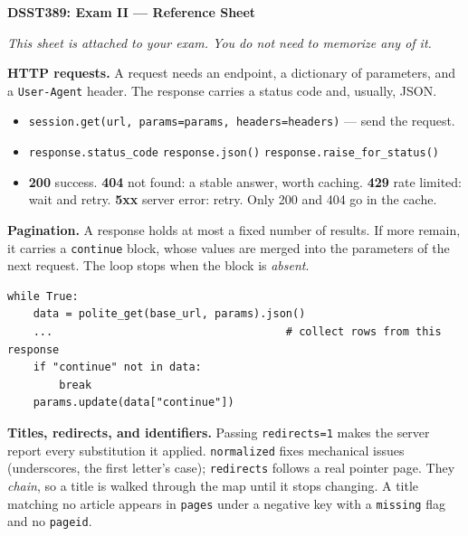 \documentclass[11pt, a4paper]{article}
\newcommand{\code}[1]{\texttt{#1}}
\begin{document}
\footnotesize
\sloppy

\begin{center}
\normalsize\textbf{DSST389: Exam II --- Reference Sheet}
\end{center}

\smallskip

\textit{This sheet is attached to your exam. You do not need to memorize any of it.}

\smallskip

\textbf{HTTP requests.}
A request needs an endpoint, a dictionary of parameters, and a \code{User-Agent} header.
The response carries a status code and, usually, JSON.

\begin{itemize}
  \item \code{session.get(url, params=params, headers=headers)} --- send the request.
  \item \code{response.status\_code} \quad \code{response.json()} \quad
        \code{response.raise\_for\_status()}
  \item \textbf{200} success. \quad \textbf{404} not found: a stable answer, worth caching.
        \quad \textbf{429} rate limited: wait and retry. \quad \textbf{5xx} server error:
        retry. Only 200 and 404 go in the cache.
\end{itemize}

\smallskip

\textbf{Pagination.}
A response holds at most a fixed number of results. If more remain, it carries a
\code{continue} block, whose values are merged into the parameters of the next request.
The loop stops when the block is \textit{absent}.

\begin{verbatim}
while True:
    data = polite_get(base_url, params).json()
    ...                                    # collect rows from this response
    if "continue" not in data:
        break
    params.update(data["continue"])
\end{verbatim}

\smallskip

\textbf{Titles, redirects, and identifiers.}
Passing \code{redirects=1} makes the server report every substitution it applied.
\code{normalized} fixes mechanical issues (underscores, the first letter's case);
\code{redirects} follows a real pointer page. They \textit{chain}, so a title is walked
through the map until it stops changing. A title matching no article appears in
\code{pages} under a negative key with a \code{missing} flag and no \code{pageid}.
\end{document}
